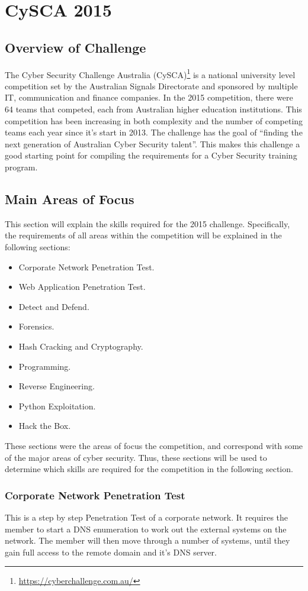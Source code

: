 \documentclass[twoside,a4paper,11pt]{report}
\begin{document}
\chapter{CySCA 2015}
	\section{Overview of Challenge}
		The Cyber Security Challenge Australia (CySCA)\footnote{\url{https://cyberchallenge.com.au/}} is a national university level competition set by the Australian Signals Directorate 
		and sponsored by multiple IT, communication and finance companies. 
		In the 2015 competition, there were 64 teams that competed, each from Australian higher education institutions. 
		This competition has been increasing in both complexity and the number of competing teams each year since it's start in 2013. 
		The challenge has the goal of ``finding the next generation of Australian Cyber Security talent''.
		This makes this challenge a good starting point for compiling the requirements for a Cyber Security training program. 
	\section{Main Areas of Focus}
		This section will explain the skills required for the 2015 challenge. 
		Specifically, the requirements of all areas within the competition will be explained in the following sections:
		\begin{itemize}
			\item Corporate Network Penetration Test.
			\item Web Application Penetration Test. 
			\item Detect and Defend.
			\item Forensics.
			\item Hash Cracking and Cryptography.
			\item Programming.
			\item Reverse Engineering.
			\item Python Exploitation.
			\item Hack the Box. 
		\end{itemize}
		These sections were the areas of focus the competition, and correspond with some of the major areas of cyber security.
		Thus, these sections will be used to determine which skills are required for the competition in the following section. 
		\subsection{Corporate Network Penetration Test}
			This is a step by step Penetration Test of a corporate network. 
			It requires the member to start a DNS enumeration to work out the external systems on the network. 
			The member will then move through a number of systems, 
			until they gain full access to the remote domain and it's DNS server. 
\end{document}
